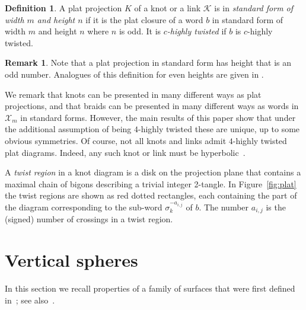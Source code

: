 \documentclass[12pt,reqno]{amsart}
\theoremstyle{plain}
\theoremstyle{definition}
\newtheorem{definition}[theorem]{Definition}
\newtheorem{remark}[theorem]{Remark}
\begin{document}
\begin{definition}\label{def: highly twisted plat}
A plat projection  $K$ of a knot or a link $\mathcal{K}$ is in 
\emph{standard form of width $m$ and height $n$} 
if it is the plat closure of a word $b$ in standard 
form of width $m$ and height $n$ where $n$ is odd.
It is \emph{$c$-highly twisted} if $b$ is $c$-highly twisted.
\end{definition}

\begin{remark}\label{rem: even plats}
Note that a plat projection in standard form has height that is an odd number.
Analogues of this definition for even heights are given in 
.
\end{remark}

We remark that knots can be presented in  many different ways as plat 
projections, and that braids can be
presented in many different ways as words in $\mathcal{X}_m$ 
in standard forms. However, the main results of this paper show that under the 
additional assumption of being $4$-highly twisted these are unique, up to some 
obvious symmetries. Of course, not all knots and links admit $4$-highly twisted 
plat diagrams. Indeed,  any
such knot or link must be hyperbolic~\cite[Theorem~A]{LMP}. 

A \emph{twist region} in a knot diagram is a disk on the projection plane that 
contains a maximal chain of bigons describing a trivial integer 2-tangle.
In Figure~\ref{fig:plat} the twist regions are shown as red dotted rectangles, 
each containing the part of the diagram corresponding to the sub-word 
$\sigma_k^{-a_{i,j}}$ of $b$. The number $a_{i,j}$ is the (signed) number of crossings 
in a twist region. 

\section{Vertical spheres}\label{Sec:VertSpheres}

In this section we recall properties of a family of surfaces that 
were first defined in~\cite{FM2}; see also~\cite{Wu}. 
\end{document}
